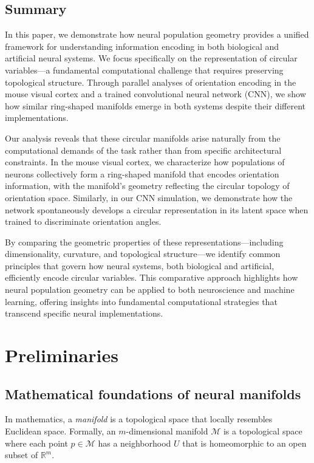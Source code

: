 \documentclass[11pt,a4paper]{article}
\begin{document}
\subsection{Summary}
In this paper, we demonstrate how neural population geometry provides a unified framework for understanding information encoding in both biological and artificial neural systems. We focus specifically on the representation of circular variables---a fundamental computational challenge that requires preserving topological structure. Through parallel analyses of orientation encoding in the mouse visual cortex and a trained convolutional neural network (CNN), we show how similar ring-shaped manifolds emerge in both systems despite their different implementations.

Our analysis reveals that these circular manifolds arise naturally from the computational demands of the task rather than from specific architectural constraints. In the mouse visual cortex, we characterize how populations of neurons collectively form a ring-shaped manifold that encodes orientation information, with the manifold's geometry reflecting the circular topology of orientation space. Similarly, in our CNN simulation, we demonstrate how the network spontaneously develops a circular representation in its latent space when trained to discriminate orientation angles.

By comparing the geometric properties of these representations---including dimensionality, curvature, and topological structure---we identify common principles that govern how neural systems, both biological and artificial, efficiently encode circular variables. This comparative approach highlights how neural population geometry can be applied to both neuroscience and machine learning, offering insights into fundamental computational strategies that transcend specific neural implementations.

\section{Preliminaries}

\subsection{Mathematical foundations of neural manifolds}

In mathematics, a \textit{manifold} is a topological space that locally resembles Euclidean space. Formally, an $m$-dimensional manifold $\mathcal{M}$ is a topological space where each point $p \in \mathcal{M}$ has a neighborhood $U$ that is homeomorphic to an open subset of $\mathbb{R}^m$. 
\end{document}
